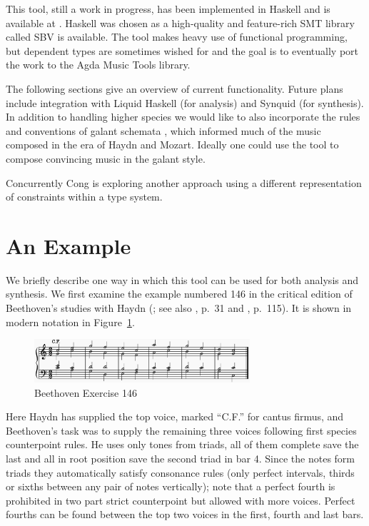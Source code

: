 \documentclass[sigplan,screen]{acmart}
\begin{document}
This tool, still a work in progress, has been implemented in Haskell
and is available at \cite{HaskellCounterpoint}. Haskell was chosen as
a high-quality and feature-rich SMT library called SBV \citep{SBV} is
available. The tool makes heavy use of functional programming, but
dependent types are sometimes wished for and the goal is to eventually
port the work to the Agda Music Tools \cite{MusicTools} library.

The following sections give an overview of current
functionality. Future plans include integration with Liquid Haskell
\citep{LiquidHaskell} (for analysis) and Synquid \citep{Synquid} (for
synthesis). In addition to handling higher species we would like to
also incorporate the rules and conventions of galant schemata
\citep{Gjerdingen2007}, which informed much of the music composed in
the era of Haydn and Mozart. Ideally one could use the tool to compose
convincing music in the galant style.

Concurrently Cong \citep{Cong2022a} is exploring another approach
using a different representation of constraints within a type system.

\section{An Example}

We briefly describe one way in which this tool can be used for both
analysis and synthesis. We first examine the example numbered 146 in
the critical edition of Beethoven's studies with Haydn
(\cite{BeethovenWerke13}; see also \cite{Nottebohm1971}, p.\ 31 and
\cite{Mann1987}, p.\ 115). It is shown in modern notation in
Figure~\ref{fig:b146}.

\begin{figure}
  \includegraphics[width=8cm]{figures/b146.png}
  \caption{Beethoven Exercise 146}
  \label{fig:b146}
\end{figure}

Here Haydn has supplied the top voice, marked ``C.F.'' for cantus
firmus, and Beethoven's task was to supply the remaining three voices
following first species counterpoint rules. He uses only tones from
triads, all of them complete save the last and all in root position
save the second triad in bar 4. Since the notes form triads they
automatically satisfy consonance rules (only perfect intervals, thirds
or sixths between any pair of notes vertically); note that a perfect
fourth is prohibited in two part strict counterpoint but allowed with
more voices. Perfect fourths can be found between the top two voices
in the first, fourth and last bars.
\end{document}

